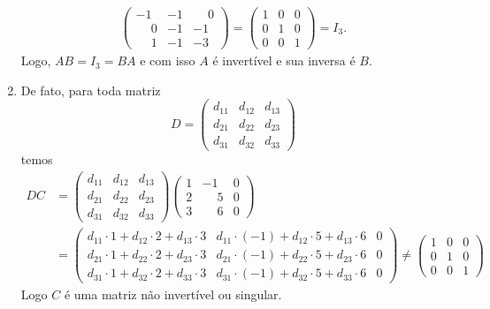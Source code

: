 \begin{exemplos}
\begin{solucao}
\begin{enumerate}
\begin{align*}
                \begin{pmatrix} -1 & -1 & \phantom{-}0\\ \phantom{-}0 & -1 & -1\\ \phantom{-}1 & -1 & -3\end{pmatrix} = \begin{pmatrix} 1 & 0 & 0\\ 0 & 1 & 0\\ 0 & 0 & 1\end{pmatrix} = I_3.
            \end{align*}
            Logo, $AB = I_3 = BA$ e com isso $A$ é invertível e sua inversa é $B$.

            \item De fato, para toda matriz
            \[
                D = \begin{pmatrix}d_{11} & d_{12} & d_{13}\\ d_{21} & d_{22} & d_{23}\\d_{31} & d_{32} & d_{33}\end{pmatrix}
            \]
            temos
            \begin{align*}
                DC &= \begin{pmatrix}d_{11} & d_{12} & d_{13}\\ d_{21} & d_{22} & d_{23}\\d_{31} & d_{32} & d_{33}\end{pmatrix}
                \begin{pmatrix}1 & -1 & 0\\2 & \phantom{-}5 & 0\\3 & \phantom{-}6 & 0\end{pmatrix}\\ &= \begin{pmatrix}
                    d_{11}\cdot 1 + d_{12}\cdot 2 + d_{13}\cdot 3 & d_{11}\cdot(-1) + d_{12}\cdot 5 + d_{13}\cdot 6 & 0\\
                    d_{21}\cdot 1 + d_{22}\cdot 2 + d_{23}\cdot 3 & d_{21}\cdot(-1) + d_{22}\cdot 5 + d_{23}\cdot 6 & 0\\
                    d_{31}\cdot 1 + d_{32}\cdot 2 + d_{33}\cdot 3 & d_{31}\cdot(-1) + d_{32}\cdot 5 + d_{33}\cdot 6 & 0
                \end{pmatrix} \ne \begin{pmatrix}1 & 0 & 0\\0 & 1 & 0\\0 & 0 & 1\end{pmatrix}
            \end{align*}
            Logo $C$ é uma matriz não invertível ou singular.
        \end{enumerate}
    \end{solucao}
\end{exemplos}

